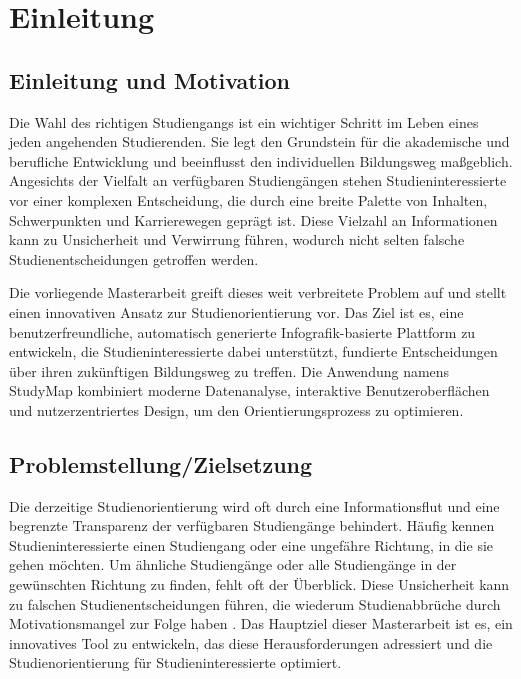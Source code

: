 \section{Einleitung}\label{einleitung}
\subsection{Einleitung und Motivation}\label{einleitung-und-motivation}
Die Wahl des richtigen Studiengangs ist ein wichtiger Schritt im Leben eines jeden angehenden Studierenden. Sie legt den Grundstein für die akademische und berufliche Entwicklung und beeinflusst den individuellen Bildungsweg maßgeblich. Angesichts der Vielfalt an verfügbaren Studiengängen stehen Studieninteressierte vor einer komplexen Entscheidung, die durch eine breite Palette von Inhalten,  Schwerpunkten und Karrierewegen geprägt ist. Diese Vielzahl an Informationen kann zu Unsicherheit und Verwirrung führen, wodurch nicht selten falsche Studienentscheidungen getroffen werden. \parencite{beckmann_verbesserung_2021}

Die vorliegende Masterarbeit greift dieses weit verbreitete Problem auf und stellt einen innovativen Ansatz zur Studienorientierung vor. Das Ziel ist es, eine benutzerfreundliche, automatisch generierte Infografik-basierte Plattform zu entwickeln, die Studieninteressierte dabei unterstützt, fundierte Entscheidungen über ihren zukünftigen Bildungsweg zu treffen. Die Anwendung namens StudyMap kombiniert moderne Datenanalyse, interaktive Benutzeroberflächen und nutzerzentriertes Design, um den Orientierungsprozess zu optimieren.

\subsection{Problemstellung/Zielsetzung}\label{problemstellung-zielsetzung}
Die derzeitige Studienorientierung wird oft durch eine Informationsflut und eine begrenzte Transparenz der verfügbaren Studiengänge behindert. Häufig kennen Studieninteressierte einen Studiengang oder eine ungefähre Richtung, in die sie gehen möchten. Um ähnliche Studiengänge oder alle Studiengänge in der gewünschten Richtung zu finden, fehlt oft der Überblick. \parencite{beckmann_verbesserung_2021} Diese Unsicherheit kann zu falschen Studienentscheidungen führen, die wiederum Studienabbrüche durch Motivationsmangel zur Folge haben \parencite{heublein_ursachen_2010}. Das Hauptziel dieser Masterarbeit ist es, ein innovatives Tool zu entwickeln, das diese Herausforderungen adressiert und die Studienorientierung für Studieninteressierte optimiert.

